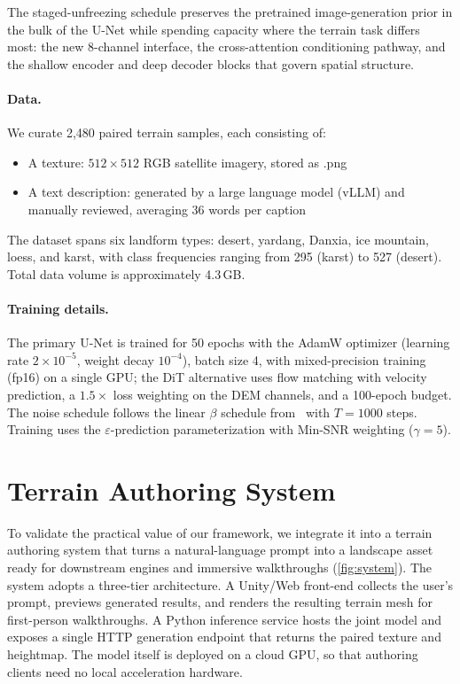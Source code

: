 \documentclass[review]{vgtc}                 %
\begin{document}
The staged-unfreezing schedule preserves the pretrained image-generation prior in the bulk of the U-Net while spending capacity where the terrain task differs most: the new 8-channel interface, the cross-attention conditioning pathway, and the shallow encoder and deep decoder blocks that govern spatial structure.

\paragraph{Data.}
We curate 2{,}480 paired terrain samples, each consisting of:
\begin{itemize}
  \item A texture: $512 \times 512$ RGB satellite imagery, stored as .png
  \item A text description: generated by a large language model (vLLM) and manually reviewed, averaging 36 words per caption
\end{itemize}
The dataset spans six landform types: desert, yardang, Danxia, ice mountain, loess, and karst, with class frequencies ranging from 295 (karst) to 527 (desert).
Total data volume is approximately 4.3\,GB.

\paragraph{Training details.}
The primary U-Net is trained for 50 epochs with the AdamW optimizer (learning rate $2 \times 10^{-5}$, weight decay $10^{-4}$), batch size 4, with mixed-precision training (fp16) on a single GPU; the DiT alternative uses flow matching with velocity prediction, a $1.5\times$ loss weighting on the DEM channels, and a 100-epoch budget.
The noise schedule follows the linear $\beta$ schedule from~\cite{DDPM:2020} with $T = 1000$ steps.
Training uses the $\varepsilon$-prediction parameterization with Min-SNR weighting ($\gamma = 5$).

\section{Terrain Authoring System}
\label{sec:system}

To validate the practical value of our framework, we integrate it into a terrain authoring system that turns a natural-language prompt into a landscape asset ready for downstream engines and immersive walkthroughs (\cref{fig:system}).
The system adopts a three-tier architecture.
A Unity/Web front-end collects the user's prompt, previews generated results, and renders the resulting terrain mesh for first-person walkthroughs.
A Python inference service hosts the joint model and exposes a single HTTP generation endpoint that returns the paired texture and heightmap.
The model itself is deployed on a cloud GPU, so that authoring clients need no local acceleration hardware.
\end{document}
